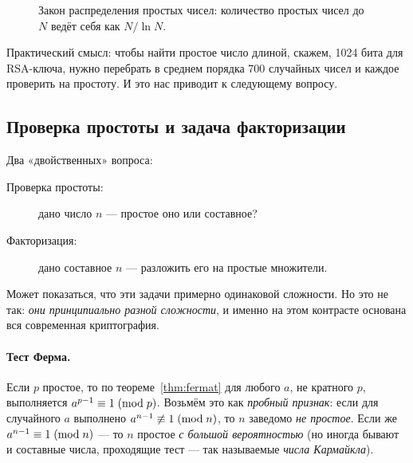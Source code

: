 \begin{figure}[H]
\centering
{}
\caption{Закон распределения простых чисел: количество простых чисел до $N$ ведёт себя как $N/\ln N$.}
\label{fig:p1-4}
\end{figure}

Практический смысл: чтобы найти простое число длиной, скажем, 1024 бита для RSA-ключа, нужно перебрать в среднем порядка 700 случайных чисел и каждое проверить на простоту. И это нас приводит к следующему вопросу.

\subsection{Проверка простоты и задача факторизации}
\label{subsec:primality}

Два «двойственных» вопроса:
\begin{description}
  \item[Проверка простоты:] дано число $n$ --- простое оно или составное?
  \item[Факторизация:] дано составное $n$ --- разложить его на простые множители.
\end{description}

Может показаться, что эти задачи примерно одинаковой сложности. Но это не так: \emph{они принципиально разной сложности}, и именно на этом контрасте основана вся современная криптография.

\paragraph*{Тест Ферма.} Если $p$ простое, то по теореме~\ref{thm:fermat} для любого $a$, не кратного $p$, выполняется $a^{p-1} \equiv 1 \;(\mathrm{mod}\;p)$. Возьмём это как \emph{пробный признак}: если для случайного $a$ выполнено $a^{n-1} \not\equiv 1 \;(\mathrm{mod}\;n)$, то $n$ заведомо \emph{не простое}. Если же $a^{n-1} \equiv 1 \;(\mathrm{mod}\;n)$ --- то $n$ простое \emph{с большой вероятностью} (но иногда бывают и составные числа, проходящие тест --- так называемые \emph{числа Кармайкла}).

